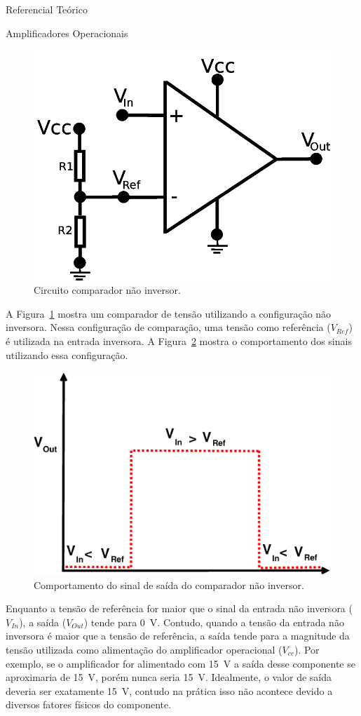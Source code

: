 \begin{chapter}{Referencial Teórico}
\begin{section}{Amplificadores Operacionais}
\begin{figure}[!h]
	\centering
	\begin{minipage}[c]{\textwidth}
	\centering
	\includegraphics[width=0.55\linewidth]{fig/nao_inversor}
	\caption{Circuito comparador não inversor.}
	\label{fig:comparador1}
	\end{minipage}
\end{figure}

A Figura~\ref{fig:comparador1} mostra um comparador de tensão utilizando a
configuração não inversora. Nessa configuração de comparação, uma tensão como
referência ($V_{Ref}$) é utilizada na entrada inversora. A
Figura~\ref{fig:sinal1} mostra o comportamento dos sinais utilizando essa
configuração.

\begin{figure}[!h]
	\centering
	\begin{minipage}[c]{\textwidth}
	\centering
	\includegraphics[width=0.55\linewidth]{fig/comparador_nao_inversor}
	\caption{Comportamento do sinal de saída do comparador não inversor.}
	\label{fig:sinal1}
	\end{minipage}
\end{figure}

Enquanto a tensão de referência for maior que o sinal da entrada não inversora
($V_{In}$), a saída ($V_{Out}$) tende para 0~V. Contudo, quando a tensão da
entrada não inversora é maior que a tensão de referência, a saída  tende para a
magnitude da tensão utilizada como alimentação do amplificador operacional
($V_{cc}$). Por exemplo, se o amplificador for alimentado com 15~V a saída desse
componente se aproximaria de 15~V, porém nunca seria 15~V. Idealmente, o valor
de saída deveria ser exatamente 15~V, contudo na prática isso não
acontece devido a diversos fatores físicos do componente.


\end{section}
\end{chapter}
